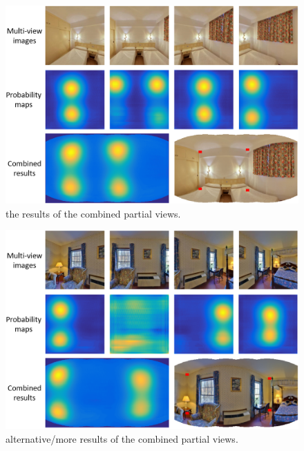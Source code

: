 \begin{figure}
	\centering
	\includegraphics[width=\linewidth]{figs/partial1.png}
	\caption{the results of the combined partial views. }
	\label{fig:partial1}
\end{figure}

\begin{figure}
	\centering
	\includegraphics[width=\linewidth]{figs/partial2.png}
	\caption{alternative/more results of the combined partial views. }
	\label{fig:partial2}
\end{figure}


